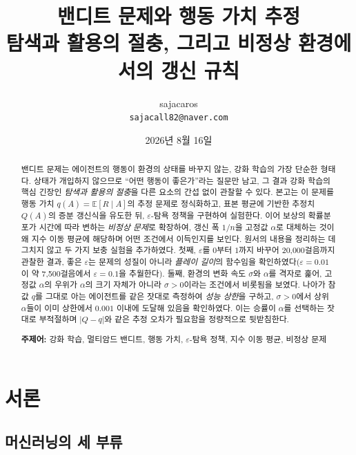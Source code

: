 \documentclass[11pt,a4paper]{article}
\title{\bfseries 밴디트 문제와 행동 가치 추정\\[2mm]
\large 탐색과 활용의 절충, 그리고 비정상 환경에서의 갱신 규칙}
\author{sajacaros\\\small \texttt{sajacall82@naver.com}}
\date{2026년 8월 16일}
\newcommand{\qt}{q}                       %
\newcommand{\Qe}{Q}                       %
\newcommand{\E}{\mathbb{E}}
\newcommand{\eps}{\varepsilon}
\begin{document}
\maketitle

\begin{abstract}
\noindent
밴디트 문제는 에이전트의 행동이 환경의 상태를 바꾸지 않는, 강화 학습의 가장 단순한 형태다.
상태가 개입하지 않으므로 ``어떤 행동이 좋은가''라는 질문만 남고, 그 결과 강화 학습의 핵심 긴장인
\emph{탐색과 활용의 절충}을 다른 요소의 간섭 없이 관찰할 수 있다.
본고는 이 문제를 행동 가치 $\qt(A)=\E[R\mid A]$의 추정 문제로 정식화하고, 표본 평균에 기반한
추정치 $\Qe(A)$의 증분 갱신식을 유도한 뒤, $\eps$-탐욕 정책을 구현하여 실험한다.
이어 보상의 확률분포가 시간에 따라 변하는 \emph{비정상 문제}로 확장하여, 갱신 폭 $1/n$을 고정값
$\alpha$로 대체하는 것이 왜 지수 이동 평균에 해당하며 어떤 조건에서 이득인지를 보인다.
원서의 내용을 정리하는 데 그치지 않고 두 가지 보충 실험을 추가하였다.
첫째, $\eps$를 $0$부터 $1$까지 바꾸어 20,000걸음까지 관찰한 결과, 좋은 $\eps$는 문제의 성질이 아니라
\emph{플레이 길이}의 함수임을 확인하였다($\eps=0.01$이 약 7,500걸음에서 $\eps=0.1$을 추월한다).
둘째, 환경의 변화 속도 $\sigma$와 $\alpha$를 격자로 훑어, 고정값 $\alpha$의 우위가 $\alpha$의 크기 자체가
아니라 $\sigma>0$이라는 조건에서 비롯됨을 보였다. 나아가 참값 $\qt$를 그대로 아는 에이전트를 같은
잣대로 측정하여 \emph{성능 상한}을 구하고, $\sigma>0$에서 상위 $\alpha$들이 이미 상한에서 $0.001$ 이내에
도달해 있음을 확인하였다. 이는 승률이 $\alpha$를 선택하는 잣대로 부적절하며 $|\Qe-\qt|$와 같은 추정
오차가 필요함을 정량적으로 뒷받침한다.

\vspace{2mm}
\noindent\textbf{주제어:} 강화 학습, 멀티암드 밴디트, 행동 가치, $\eps$-탐욕 정책, 지수 이동 평균, 비정상 문제
\end{abstract}

\tableofcontents
\vspace{4mm}

\section{서론}

\subsection{머신러닝의 세 부류}
\end{document}
